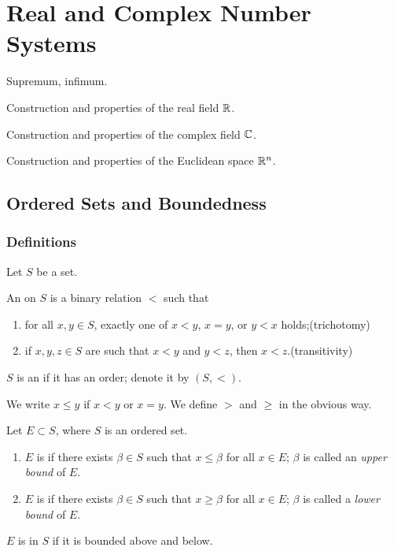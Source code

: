 \chapter{Real and Complex Number Systems}\label{chap:number-systems}

\begin{summary}
\item Supremum, infimum.
\item Construction and properties of the real field $\mathbb R$.
\item Construction and properties of the complex field $\mathbb C$.
\item Construction and properties of the Euclidean space $\mathbb R^n$.
\end{summary}

\section{Ordered Sets and Boundedness}
\subsection{Definitions}
Let $S$ be a set.
\begin{definition}
An  on $S$ is a binary relation $<$ such that
\begin{enumerate}[label=(\roman*)]
\item for all $x,y\in S$, exactly one of $x<y$, $x=y$, or $y<x$ holds;\hfill(trichotomy)
\item if $x,y,z\in S$ are such that $x<y$ and $y<z$, then $x<z$.\hfill(transitivity)
\end{enumerate}
$S$ is an  if it has an order; denote it by $(S,<)$.
\end{definition}

\begin{notation}
We write $x\le y$ if $x<y$ or $x=y$. We define $>$ and $\ge$ in the obvious way.
\end{notation}

\begin{definition}[Boundedness]
Let $E\subset S$, where $S$ is an ordered set.
\begin{enumerate}[label=(\roman*)]
\item $E$ is  if there exists $\beta\in S$ such that $x\le\beta$ for all $x\in E$; $\beta$ is called an \emph{upper bound} of $E$.
\item $E$ is  if there exists $\beta\in S$ such that $x\ge\beta$ for all $x\in E$; $\beta$ is called a \emph{lower bound} of $E$.
\end{enumerate}
$E$ is  in $S$ if it is bounded above and below.
\end{definition}

